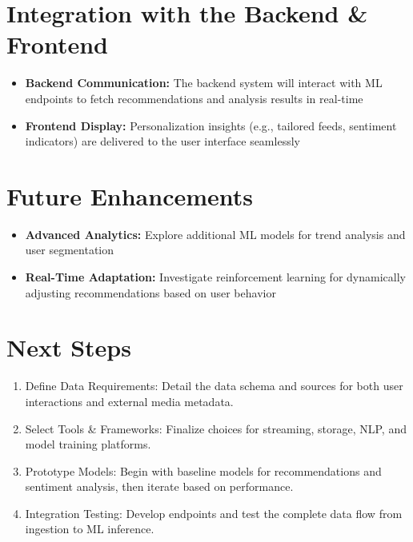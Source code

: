 \documentclass[11pt]{article}
\begin{document}
\section{Integration with the Backend \& Frontend}
\begin{itemize}[noitemsep]
    \item \textbf{Backend Communication:} The backend system will interact with ML endpoints to fetch recommendations and analysis results in real-time
    \item \textbf{Frontend Display:} Personalization insights (e.g., tailored feeds, sentiment indicators) are delivered to the user interface seamlessly
\end{itemize}

\section{Future Enhancements}
\begin{itemize}[noitemsep]
    \item \textbf{Advanced Analytics:} Explore additional ML models for trend analysis and user segmentation
    \item \textbf{Real-Time Adaptation:} Investigate reinforcement learning for dynamically adjusting recommendations based on user behavior
\end{itemize}

\section{Next Steps}
\begin{enumerate}[noitemsep]
    \item Define Data Requirements: Detail the data schema and sources for both user interactions and external media metadata.
    \item Select Tools \& Frameworks: Finalize choices for streaming, storage, NLP, and model training platforms.
    \item Prototype Models: Begin with baseline models for recommendations and sentiment analysis, then iterate based on performance.
    \item Integration Testing: Develop endpoints and test the complete data flow from ingestion to ML inference.
\end{enumerate}
\end{document}
